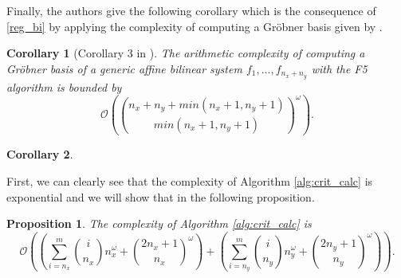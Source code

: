 \documentclass[english]{article}
\newtheorem{proposition}{Proposition}[section]
\newtheorem{corollary}{Corollary}[section]
\begin{document}
		Finally, the authors give the following corollary which is the consequence of \ref{reg_bi} by applying the complexity of computing a Gröbner basis given by \cite{Bardet04}.
		
		\begin{corollary}[Corollary 3 in \cite{FSS11}]\label{complex_bi}
			The arithmetic complexity of computing a Gröbner basis of a generic affine bilinear system $f_1,...,f_{n_x + n_y}$ with the F5 algorithm is bounded by
			$$\mathcal{O}\left(\binom{n_x + n_y + min(n_x + 1, n_y + 1)}{min(n_x + 1, n_y + 1)}^\omega\right).$$
		\end{corollary}
		
		\begin{corollary}
			
		\end{corollary}
		
		First, we can clearly see that the complexity of Algorithm \ref{alg:crit_calc} is exponential and we will show that in the following proposition.
		
		\begin{proposition}\label{complexCrit}
			The complexity of Algorithm \ref{alg:crit_calc} is
			$$
			\mathcal{O}\left(\left(\sum_{i = n_x}^{m} \binom{i}{n_x}n_x^{\omega} + \binom{2n_x + 1}{n_x}^\omega\right) + \left(\sum_{i = n_y}^{m} \binom{i}{n_y}n_y^{\omega} + \binom{2n_y + 1}{n_y}^\omega\right)\right).
			$$
		\end{proposition}
		
\end{document}

